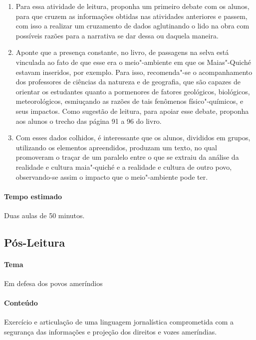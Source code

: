 \documentclass[11pt]{extarticle}
\begin{document}
\begin{enumerate}
\item
Para essa atividade de leitura, proponha um primeiro debate com os alunos, 
para que cruzem as informações obtidas nas atividades anteriores e passem, 
com isso a realizar um cruzamento de dados aglutinando o lido na obra
com possíveis razões para a narrativa se dar dessa ou daquela maneira.

\item
Aponte que a presença constante, no livro, de passagens na selva está vinculada ao fato de que esse era 
o meio"-ambiente em que os Maias"-Quiché estavam inseridos, por exemplo.
Para isso, recomenda"-se o acompanhamento dos professores de ciências da
natureza e de geografia, que são capazes de orientar os estudantes
quanto a pormenores de fatores geológicos, biológicos, meteorológicos,
esmiuçando as razões de tais fenômenos físico"-químicos, e seus impactos.
Como sugestão de leitura, para apoiar esse debate, proponha aos alunos o trecho das página 91 a 96 do livro.

\item
Com esses dados colhidos, é interessante que os alunos, divididos em
grupos, utilizando os elementos apreendidos, produzam um texto, no qual
promoveram o traçar de um paralelo entre o que se extraiu da análise da
realidade e cultura maia"-quiché e a realidade e cultura de outro povo,
observando-se assim o impacto que o meio"-ambiente pode ter.

\end{enumerate}

\paragraph{Tempo estimado} Duas aulas de 50 minutos. 

\subsection{Pós-Leitura}

\paragraph{Tema} Em defesa dos povos ameríndios

\paragraph{Conteúdo}  Exercício e articulação de uma linguagem jornalística
comprometida com a segurança das informações e projeção dos direitos e vozes
ameríndias. 
\end{document}
